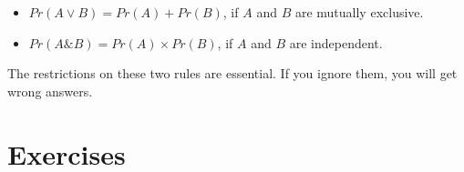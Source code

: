 \documentclass[justified]{tufte-book}
\providecommand{\tightlist}{%
  \setlength{\itemsep}{0pt}\setlength{\parskip}{0pt}}
\renewcommand{\wedge}{\mathbin{\&}}
\theoremstyle{definition}
\theoremstyle{definition}
\theoremstyle{definition}
\theoremstyle{remark}
\begin{document}
\begin{itemize}
\tightlist
\item
  \(Pr(A \vee B) = Pr(A) + Pr(B)\), if \(A\) and \(B\) are mutually
  exclusive.
\item
  \(Pr(A \wedge B) = Pr(A) \times Pr(B)\), if \(A\) and \(B\) are
  independent.
\end{itemize}

The restrictions on these two rules are essential. If you ignore them,
you will get wrong answers.

\hypertarget{exercises-4}{%
\section*{Exercises}\label{exercises-4}}
\end{document}
